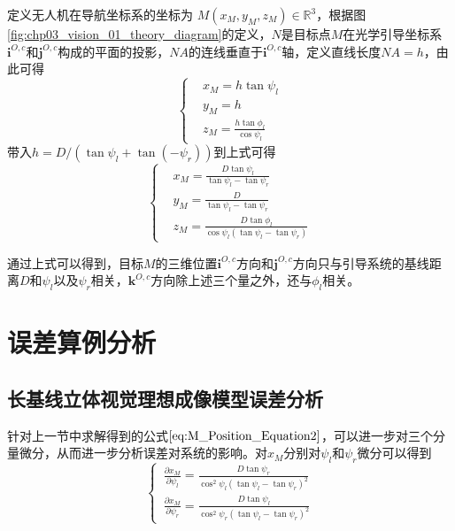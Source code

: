 定义无人机在导航坐标系的坐标为 $M(x_M, y_M, z_M)\in \mathbb{R}^3 $，根据图\ref{fig:chp03_vision_01_theory_diagram}的定义，$N$是目标点$M$在光学引导坐标系$\mathbf{i}^{O,c}$和$\mathbf{j}^{O,c}$构成的平面的投影，$NA$的连线垂直于$\mathbf{i}^{O,c}$轴，定义直线长度$NA = h$，由此可得
\begin{equation}
\left \{
\begin{aligned}
&x_M = h \tan \psi_l  \\
&y_M = h \\
&z_M = \frac{h\tan \phi_l}{\cos \psi_l}
\end{aligned} \right.
\label{eq:M_Positon_Equation}
\end{equation}
带入$h=D/(\tan \psi_l + \tan (-\psi_r))$到上式可得
\begin{equation}
\left \{
\begin{aligned}
\label{eq:M_Position_Equation2}
&x_M =  \frac{D\tan \psi_l}{\tan \psi_l - \tan \psi_r}            \\
&y_M =  \frac{D}{\tan \psi_l - \tan \psi_r} \\
&z_M  = \frac{D\tan \phi_l}{\cos \psi_l(\tan \psi_l - \tan \psi_r)}
\end{aligned} \right. 
\end{equation}

通过上式可以得到，目标$M$的三维位置$\mathbf{i}^{O,c}$方向和$\mathbf{j}^{O,c}$方向只与引导系统的基线距离$D$和$\psi_l$以及$\psi_r$相关，$\mathbf{k}^{O,c}$方向除上述三个量之外，还与$\phi_l$相关。
\section{误差算例分析}
\subsection{长基线立体视觉理想成像模型误差分析}
针对上一节中求解得到的公式$\ref{eq:M_Position_Equation2}$，可以进一步对三个分量微分，从而进一步分析误差对系统的影响。对$x_M$分别对$\psi_l$和$\psi_r$微分可以得到
\begin{equation}
\left\{ \,
\begin{aligned}
\frac{ \partial x_M}{ \partial \psi_l} = \frac{D \tan \psi_r}{ \cos^2 \psi_l (\tan \psi_l - \tan \psi_r)^2} \\
\frac{ \partial x_M}{\partial \psi_r} = \frac{D \tan \psi_l}{\cos^2 \psi_r (\tan \psi_l - \tan \psi_r)^2} 
\end{aligned}
\right.
\end{equation}

